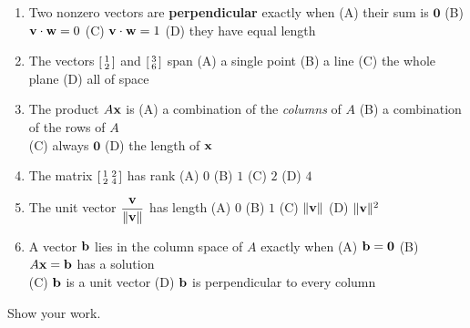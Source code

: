 \begin{enumerate}[leftmargin=1.9em, itemsep=9pt]
  \item Two nonzero vectors are \textbf{perpendicular} exactly when
    \hfill (A) their sum is $\mathbf 0$ \quad (B) $\mathbf{v}\cdot\mathbf{w}=0$ \quad
    (C) $\mathbf{v}\cdot\mathbf{w}=1$ \quad (D) they have equal length
  \item The vectors $\begin{bsmallmatrix}1\\2\end{bsmallmatrix}$ and
    $\begin{bsmallmatrix}3\\6\end{bsmallmatrix}$ span
    \hfill (A) a single point \quad (B) a line \quad (C) the whole plane \quad (D) all of space
  \item The product $A\mathbf{x}$ is
    \hfill (A) a combination of the \emph{columns} of $A$ \quad (B) a combination of the rows of $A$ \\
    \phantom{x}\hfill (C) always $\mathbf 0$ \quad (D) the length of $\mathbf{x}$
  \item The matrix $\begin{bsmallmatrix}1&2\\2&4\end{bsmallmatrix}$ has rank
    \hfill (A) $0$ \quad (B) $1$ \quad (C) $2$ \quad (D) $4$
  \item The unit vector $\dfrac{\mathbf{v}}{\|\mathbf{v}\|}$ has length
    \hfill (A) $0$ \quad (B) $1$ \quad (C) $\|\mathbf{v}\|$ \quad (D) $\|\mathbf{v}\|^2$
  \item A vector $\mathbf{b}$ lies in the column space of $A$ exactly when
    \hfill (A) $\mathbf{b}=\mathbf 0$ \quad (B) $A\mathbf{x}=\mathbf{b}$ has a solution \\
    \phantom{x}\hfill (C) $\mathbf{b}$ is a unit vector \quad (D) $\mathbf{b}$ is perpendicular to every column
\end{enumerate}

Show your work.

